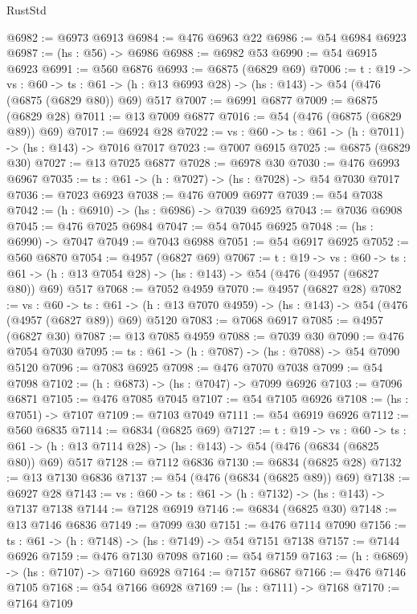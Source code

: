\begin{lexlean}{RustStd}
\begin{coremodule}
@6982 := @6973 @6913
@6984 := @476 @6963 @22
@6986 := @54 @6984 @6923
@6987 := (hs : @56) -> @6986
@6988 := @6982 @53
@6990 := @54 @6915 @6923
@6991 := @560 @6876
@6993 := @6875 (@6829 @69)
@7006 := {t : @19} ->
  {vs : @60} ->
  {ts : @61} -> (h : @13 @6993 @28) -> (hs : @143) -> @54 (@476 (@6875 (@6829 @80)) @69) @517
@7007 := @6991 @6877
@7009 := @6875 (@6829 @28)
@7011 := @13 @7009 @6877
@7016 := @54 (@476 (@6875 (@6829 @89)) @69)
@7017 := @6924 @28
@7022 := {vs : @60} -> {ts : @61} -> (h : @7011) -> (hs : @143) -> @7016 @7017
@7023 := @7007 @6915
@7025 := @6875 (@6829 @30)
@7027 := @13 @7025 @6877
@7028 := @6978 @30
@7030 := @476 @6993 @6967
@7035 := {ts : @61} -> (h : @7027) -> (hs : @7028) -> @54 @7030 @7017
@7036 := @7023 @6923
@7038 := @476 @7009 @6977
@7039 := @54 @7038
@7042 := (h : @6910) -> (hs : @6986) -> @7039 @6925
@7043 := @7036 @6908
@7045 := @476 @7025 @6984
@7047 := @54 @7045 @6925
@7048 := (hs : @6990) -> @7047
@7049 := @7043 @6988
@7051 := @54 @6917 @6925
@7052 := @560 @6870
@7054 := @4957 (@6827 @69)
@7067 := {t : @19} ->
  {vs : @60} ->
  {ts : @61} -> (h : @13 @7054 @28) -> (hs : @143) -> @54 (@476 (@4957 (@6827 @80)) @69) @517
@7068 := @7052 @4959
@7070 := @4957 (@6827 @28)
@7082 := {vs : @60} ->
  {ts : @61} -> (h : @13 @7070 @4959) -> (hs : @143) -> @54 (@476 (@4957 (@6827 @89)) @69) @5120
@7083 := @7068 @6917
@7085 := @4957 (@6827 @30)
@7087 := @13 @7085 @4959
@7088 := @7039 @30
@7090 := @476 @7054 @7030
@7095 := {ts : @61} -> (h : @7087) -> (hs : @7088) -> @54 @7090 @5120
@7096 := @7083 @6925
@7098 := @476 @7070 @7038
@7099 := @54 @7098
@7102 := (h : @6873) -> (hs : @7047) -> @7099 @6926
@7103 := @7096 @6871
@7105 := @476 @7085 @7045
@7107 := @54 @7105 @6926
@7108 := (hs : @7051) -> @7107
@7109 := @7103 @7049
@7111 := @54 @6919 @6926
@7112 := @560 @6835
@7114 := @6834 (@6825 @69)
@7127 := {t : @19} ->
  {vs : @60} ->
  {ts : @61} -> (h : @13 @7114 @28) -> (hs : @143) -> @54 (@476 (@6834 (@6825 @80)) @69) @517
@7128 := @7112 @6836
@7130 := @6834 (@6825 @28)
@7132 := @13 @7130 @6836
@7137 := @54 (@476 (@6834 (@6825 @89)) @69)
@7138 := @6927 @28
@7143 := {vs : @60} -> {ts : @61} -> (h : @7132) -> (hs : @143) -> @7137 @7138
@7144 := @7128 @6919
@7146 := @6834 (@6825 @30)
@7148 := @13 @7146 @6836
@7149 := @7099 @30
@7151 := @476 @7114 @7090
@7156 := {ts : @61} -> (h : @7148) -> (hs : @7149) -> @54 @7151 @7138
@7157 := @7144 @6926
@7159 := @476 @7130 @7098
@7160 := @54 @7159
@7163 := (h : @6869) -> (hs : @7107) -> @7160 @6928
@7164 := @7157 @6867
@7166 := @476 @7146 @7105
@7168 := @54 @7166 @6928
@7169 := (hs : @7111) -> @7168
@7170 := @7164 @7109

\end{coremodule}
\end{lexlean}
